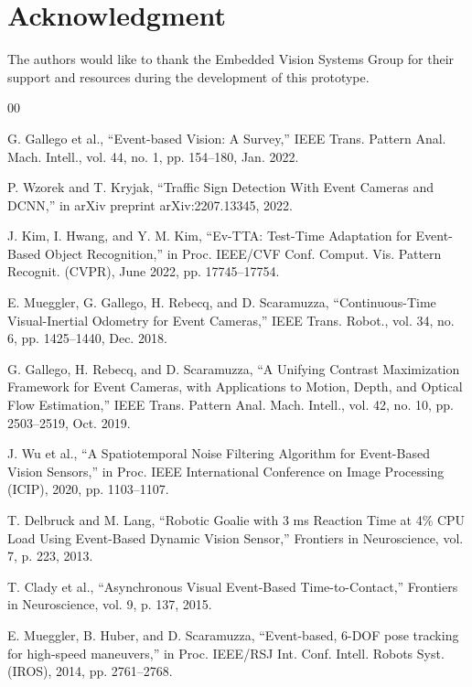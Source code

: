 \documentclass[conference]{IEEEtran}
\begin{document}

\section*{Acknowledgment}
The authors would like to thank the Embedded Vision Systems Group for their support and resources during the development of this prototype.
\begin{thebibliography}{00}

 G. Gallego et al., ``Event-based Vision: A Survey,'' IEEE Trans. Pattern Anal. Mach. Intell., vol. 44, no. 1, pp. 154--180, Jan. 2022.

 P. Wzorek and T. Kryjak, ``Traffic Sign Detection With Event Cameras and DCNN,'' in arXiv preprint arXiv:2207.13345, 2022.

 J. Kim, I. Hwang, and Y. M. Kim, ``Ev-TTA: Test-Time Adaptation for Event-Based Object Recognition,'' in Proc. IEEE/CVF Conf. Comput. Vis. Pattern Recognit. (CVPR), June 2022, pp. 17745--17754.

 E. Mueggler, G. Gallego, H. Rebecq, and D. Scaramuzza, ``Continuous-Time Visual-Inertial Odometry for Event Cameras,'' IEEE Trans. Robot., vol. 34, no. 6, pp. 1425--1440, Dec. 2018.

 G. Gallego, H. Rebecq, and D. Scaramuzza, ``A Unifying Contrast Maximization Framework for Event Cameras, with Applications to Motion, Depth, and Optical Flow Estimation,'' IEEE Trans. Pattern Anal. Mach. Intell., vol. 42, no. 10, pp. 2503--2519, Oct. 2019.

 J. Wu et al., ``A Spatiotemporal Noise Filtering Algorithm for Event-Based Vision Sensors,'' in Proc. IEEE International Conference on Image Processing (ICIP), 2020, pp. 1103--1107.

 T. Delbruck and M. Lang, ``Robotic Goalie with 3 ms Reaction Time at 4\% CPU Load Using Event-Based Dynamic Vision Sensor,'' Frontiers in Neuroscience, vol. 7, p. 223, 2013.

 T. Clady et al., ``Asynchronous Visual Event-Based Time-to-Contact,'' Frontiers in Neuroscience, vol. 9, p. 137, 2015.

 E. Mueggler, B. Huber, and D. Scaramuzza, ``Event-based, 6-DOF pose tracking for high-speed maneuvers,'' in Proc. IEEE/RSJ Int. Conf. Intell. Robots Syst. (IROS), 2014, pp. 2761--2768.


\end{thebibliography}
\end{document}

